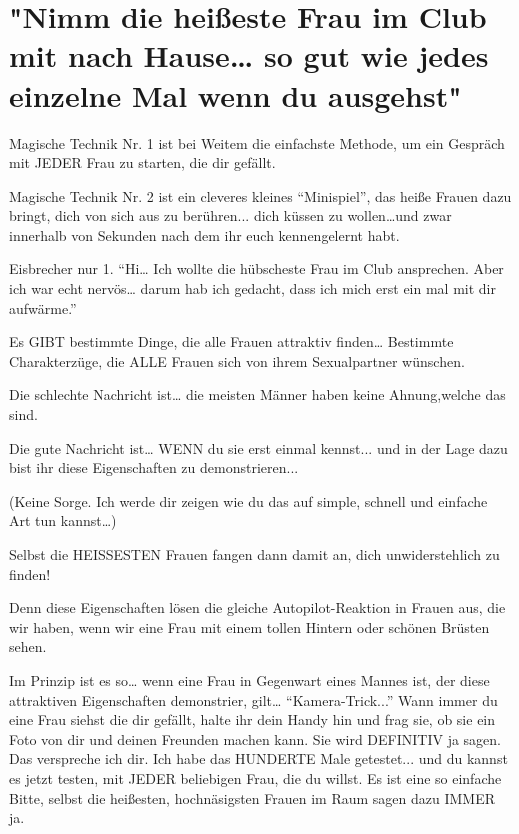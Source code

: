 \section{"Nimm die heißeste Frau im Club mit nach Hause… so gut wie jedes einzelne Mal wenn du ausgehst"}

Magische Technik Nr. 1 ist bei Weitem die einfachste Methode, um ein Gespräch mit JEDER Frau zu starten, die dir gefällt. 

Magische Technik Nr. 2 ist ein cleveres kleines “Minispiel”, das heiße Frauen dazu bringt, dich von sich aus zu berühren... dich küssen zu wollen…und zwar innerhalb von Sekunden nach dem ihr euch kennengelernt habt.

Eisbrecher nur 1.  “Hi… Ich wollte die hübscheste Frau im Club ansprechen. Aber ich war echt nervös… darum hab ich gedacht, dass ich mich erst ein mal mit dir aufwärme.”

Es GIBT bestimmte Dinge, die alle Frauen
attraktiv finden…
Bestimmte Charakterzüge, die ALLE Frauen sich von ihrem Sexualpartner wünschen. 

Die schlechte Nachricht ist… die meisten Männer haben keine Ahnung,welche das sind.

Die gute Nachricht ist… WENN du sie erst einmal kennst... und in der Lage dazu bist ihr diese Eigenschaften zu demonstrieren...

(Keine Sorge. Ich werde dir zeigen wie du das auf simple, schnell und
einfache Art tun kannst…)

Selbst die HEISSESTEN Frauen fangen dann damit an, dich unwiderstehlich zu finden!

Denn diese Eigenschaften lösen die gleiche Autopilot-Reaktion in Frauen aus, die wir haben, wenn wir eine Frau mit einem tollen Hintern oder schönen Brüsten sehen.

Im Prinzip ist es so… wenn eine Frau in Gegenwart eines Mannes ist, der diese attraktiven Eigenschaften demonstrier, gilt… 
“Kamera-Trick...”
Wann immer du eine Frau siehst die dir gefällt, halte ihr dein Handy hin und frag sie, ob sie ein Foto von dir und deinen Freunden machen kann.
Sie wird DEFINITIV ja sagen. Das verspreche ich dir. Ich habe das HUNDERTE Male getestet... und du kannst es jetzt testen, mit JEDER beliebigen Frau, die du willst.
Es ist eine so einfache Bitte, selbst die heißesten, hochnäsigsten Frauen im Raum sagen dazu IMMER ja.


